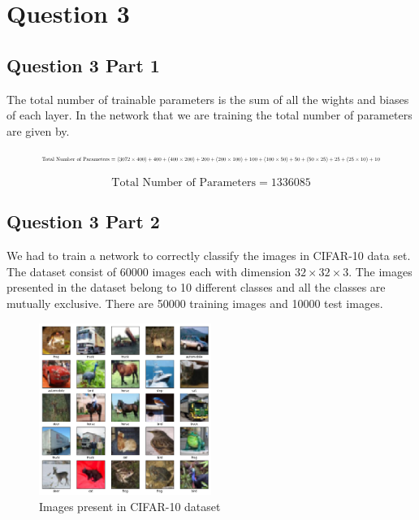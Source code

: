 \documentclass[12pt]{report}
\begin{document}
\chapter*{Question 3}

\section*{Question 3 Part 1}
The total number of trainable parameters is the sum of all the wights and biases of each layer. In the network that we are training the total number of parameters are given by.

\begin{equation*}
\resizebox{.9\hsize}{!}{
	\text{Total Number of Parameters} = $(3072 \times 400) + 400 + (400 \times 200) + 200 + (200 \times 100) + 100 + (100 \times 50) + 50 + (50 \times 25) + 25 + (25 \times 10) + 10$  
}
\end{equation*}

\begin{equation*}
\text{Total Number of Parameters} = 1336085
\end{equation*}


\section*{Question 3 Part 2}
We had to train a network to correctly classify the images in CIFAR-10 data set. The dataset consist of 60000 images each with dimension $32\times32\times3$. The images presented in the dataset belong to 10 different classes and all the classes are mutually exclusive. There are 50000 training images and 10000 test images.
\begin{figure}[H]
	\centering
	\includegraphics[width=0.5\textwidth]{CIFAR}
	\caption{Images present in CIFAR-10 dataset}
\end{figure}
\end{document}
